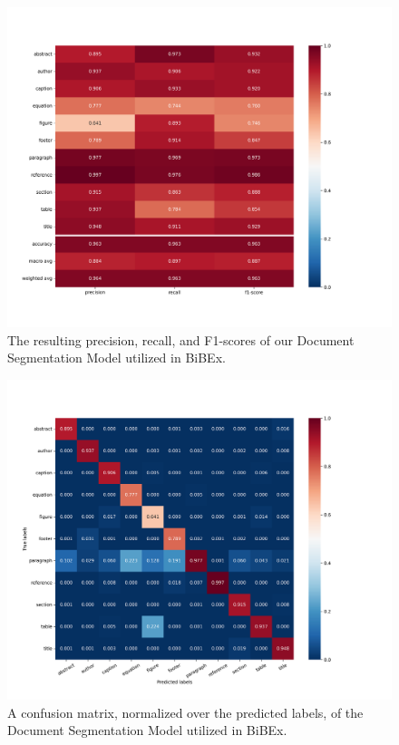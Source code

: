 \begin{figure}[bp!]
    \centering
    \includegraphics[trim=2cm 0 4cm 0, width=1.0\linewidth]{images/results/document_segmentation/docseg_cls_report_all.png}
    \caption{The resulting precision, recall, and F1-scores of our Document Segmentation Model utilized in BiBEx.}
    \label{fig:results_final_docseg_cls}
\end{figure}

\begin{figure}[bp!]
    \centering
    \includegraphics[trim=2cm 0 4cm 0, width=1.0\linewidth]{images/results/document_segmentation/docseg_conf_matrix_norm_pred_all.png}
    \caption{A confusion matrix, normalized over the predicted labels, of the Document Segmentation Model utilized in BiBEx.}
    \label{fig:results_final_docseg_conf}
\end{figure}
\FloatBarrier

